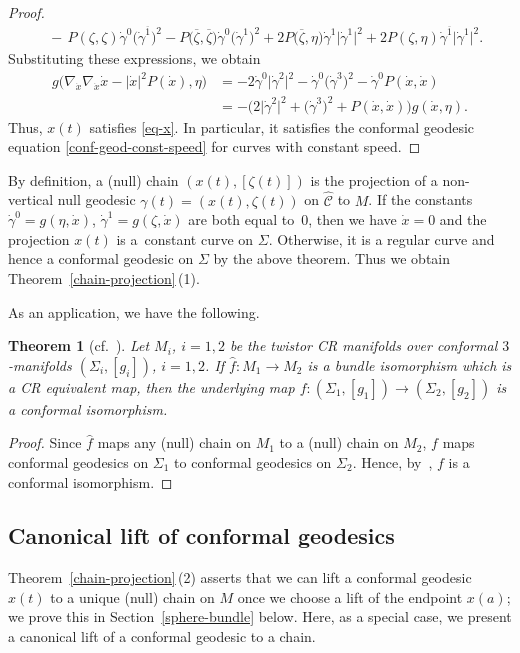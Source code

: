 \documentclass[11pt]{article}
\numberwithin{equation}{section}
\newcommand\ol{\overline}
\newcommand{\wh}{\widehat}
\numberwithin{equation}{section}
\newtheorem{Theorem}{Theorem}[section]
\begin{document}
\begin{proof}
\begin{align*}
&{}{-}\, P(\zeta, \zeta) \dot\gamma^0\bigl(\dot\gamma^{\ol1}\bigr)^2\!-P\bigl(\ol\zeta, \ol\zeta\bigr) \dot\gamma^0\bigl(\dot\gamma^{1}\bigr)^2+2P\bigl(\ol\zeta, \eta\bigr)\dot\gamma^1\bigl|\dot\gamma^1\bigr|^2
 + 2P(\zeta, \eta)\dot\gamma^{\ol1}\bigl|\dot\gamma^1\bigr|^2.
\end{align*}
Substituting these expressions, we obtain
\begin{align*}
g\bigl(\nabla_{\dot x}\nabla_{\dot x}\dot x-|\dot x|^2P(\dot x) ,\eta\bigr)
&=-2\dot\gamma^0\bigl|\dot\gamma^2\bigr|^2-\dot\gamma^0\bigl(\dot\gamma^3\bigr)^2-\dot\gamma^0P(\dot x, \dot x) \\
&=-\bigl(2\bigl|\dot\gamma^2\bigr|^2+\bigl(\dot\gamma^3\bigr)^2+P(\dot x, \dot x)\bigr)g(\dot x, \eta).
\end{align*}
Thus, $x(t)$ satisfies \eqref{eq-x}. In particular, it satisfies the conformal geodesic equation \eqref{conf-geod-const-speed} for curves with constant speed.
\end{proof}

By definition, a (null) chain $(x(t), [\zeta(t)])$ is the projection of a non-vertical null geodesic $\gamma(t)=(x(t), \zeta(t))$ on $\wh{\mathcal{C}}$ to $M$. If the constants $\dot\gamma^0=g(\eta, \dot x)$,
$\dot\gamma^1=g(\zeta, \dot x)$ are both equal to~0, then we have $\dot x=0$ and the projection $x(t)$ is a~constant curve on $\Sigma$. Otherwise, it is a regular curve and hence a conformal geodesic on $\Sigma$ by the above theorem. Thus we obtain Theorem~\ref{chain-projection}\,(1).

As an application, we have the following.

\begin{Theorem}[cf.\ \cite{SY}]
Let $M_i$, $i=1, 2$ be the twistor CR manifolds over conformal $3$-manifolds $(\Sigma_i, [g_i])$, $i=1, 2$. If $\wh f\colon M_1\to M_2$ is a bundle isomorphism which is a CR equivalent map, then the underlying map $f\colon (\Sigma_1, [g_1])\to (\Sigma_2, [g_2])$ is a conformal isomorphism.
\end{Theorem}
\begin{proof}
Since $\wh f$ maps any (null) chain on $M_1$ to a (null) chain on $M_2$, $f$ maps conformal geodesics on $\Sigma_1$ to conformal geodesics on $\Sigma_2$. Hence, by~\cite[Theorem 2.3]{Kuo}, $f$ is a conformal isomorphism.
\end{proof}

\subsection{Canonical lift of conformal geodesics}\label{lift}
Theorem~\ref{chain-projection}\,(2) asserts that we can lift a conformal geodesic $x(t)$ to a unique (null) chain on $M$ once we choose a lift of the endpoint $x(a)$; we prove this in Section~\ref{sphere-bundle} below.
Here, as a special case, we present a canonical lift of a conformal geodesic to a chain.
\end{document}
